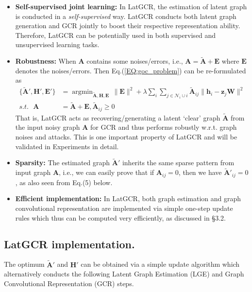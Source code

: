 \documentclass{article}
\begin{document}
\begin{itemize}
\item \textbf{Self-supervised joint learning:} In LatGCR, the estimation of latent graph is conducted in a \emph{self-supervised} way. LatGCR conducts both latent graph generation and GCR jointly to boost their respective representation ability. Therefore, LatGCR can be potentially used in both supervised and unsupervised learning tasks.
\item \textbf{Robustness:} When $\mathbf{A}$ contains some noises/errors, i.e., $\mathbf{A}=\widetilde{\mathbf{A}}+\mathbf{E}$ where $\textbf{E}$ denotes the noises/errors.
   Then Eq.(\ref{EQ:goc_problem}) can be re-formulated as
\begin{align}\label{goc_analysis}
\{{\widetilde{\mathbf{A}}}',\mathbf{H}', \mathbf{E}'\}
&= \mathop{\arg\min}_{\widetilde{\mathbf{A}},\mathbf{H},\mathbf{E}} \,
\|\mathbf{E}\|^2 +
\lambda \sum_i\sum_{j\in \mathcal{N}_i\cup i} \widetilde{\mathbf{A}}_{ij}\big\| \mathbf{h}_i - \mathbf{z}_j\mathbf{W}\big\|^2 \nonumber\\
s.t. \ \ \ \mathbf{A}&= \widetilde{\mathbf{A}} +\mathbf{E},\widetilde{\mathbf{A}}_{ij} \geq 0
\end{align}
That is, LatGCR acts as recovering/generating a latent `clear' graph $\widetilde{\mathbf{A}}$ from the input noisy graph $\mathbf{A}$ for GCR and thus performs robustly w.r.t. graph noises and attacks. This is one important property of LatGCR and will be validated in Experiments in detail.
\item \textbf{Sparsity:}
  The estimated graph $\widetilde{\mathbf{A}}'$ inherits the same sparse pattern from input graph $\textbf{A}$, i.e., we can easily prove that
  if $\mathbf{A}_{ij}=0$, then we have $\widetilde{\mathbf{A}}'_{ij}=0$, as also seen from Eq.(5) below.
  \item \textbf{Efficient implementation:} In LatGCR, both graph estimation and graph convolutional representation are implemented via simple one-step update rules which thus can be computed very efficiently, as discussed in \S 3.2.


\end{itemize}

\subsection{LatGCR implementation.}
The optimum ${\widetilde{\mathbf{A}}}'$ and $\mathbf{H}'$ can be obtained via a simple update algorithm which {alternatively} conducts the following Latent Graph Estimation (LGE) and Graph Convolutional Representation (GCR) steps.
\end{document}
